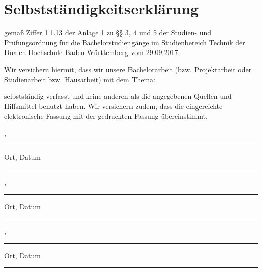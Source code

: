 \thispagestyle{empty}
\section*{\Huge{Selbstständigkeitserklärung}}

gemäß Ziffer 1.1.13 der Anlage 1 zu §§ 3, 4 und 5  der Studien- und Prüfungsordnung für die Bachelorstudiengänge im Studienbereich Technik der Dualen Hochschule Baden-Würt­tem­berg vom 29.09.2017.

\noindent Wir versichern hiermit, dass wir unsere Bachelorarbeit (bzw. Projektarbeit oder Studienarbeit bzw. Hausarbeit) mit dem Thema: 
\begin{center}
	\Large\textbf{\vTitel}
\end{center}
selbstständig verfasst und keine anderen als die angegebenen Quellen und Hilfsmittel benutzt haben. Wir versichern zudem, dass die eingereichte elektronische Fassung mit der gedruckten Fassung übereinstimmt.

\vfill
\leavevmode
\newline
\parbox{7cm}{\strut\centering \vBearbeitungsort, \vAbgabedatum\hrule\strut\centering\footnotesize Ort, Datum} 
\hfill
\parbox{7cm}{\strut\hspace{1pt} \hrule\strut\centering\footnotesize \vJB}
\newline
\vspace{1cm}
\newline
\parbox{7cm}{\strut\centering \vBearbeitungsort, \vAbgabedatum\hrule\strut\centering\footnotesize Ort, Datum} 
\hfill
\parbox{7cm}{\strut\hspace{1pt} \hrule\strut\centering\footnotesize \vLB}
\newline
\vspace{1cm}
\newline
\parbox{7cm}{\strut\centering \vBearbeitungsort, \vAbgabedatum\hrule\strut\centering\footnotesize Ort, Datum} 
\hfill
\parbox{7cm}{\strut\hspace{1pt} \hrule\strut\centering\footnotesize \vHS}
\newpage